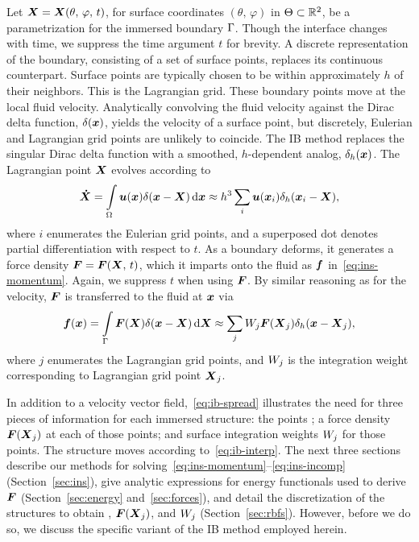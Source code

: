 Let $\boldsymbol{X} = \boldsymbol{X}(\theta,\,\varphi,\,t)$, for surface coordinates $(\theta,\,\varphi)$ in
$\Theta\subset\mathbb{R}^2$, be a parametrization for the immersed boundary $\Gamma$.
Though the interface changes with time, we suppress the time argument $t$ for brevity. A
discrete representation of the boundary, consisting of a set of surface points, replaces
its continuous counterpart.  Surface points are typically chosen to be within
approximately $h$ of their neighbors.  This is the Lagrangian grid. These boundary points
move at the local fluid velocity.  Analytically convolving the fluid velocity against the
Dirac delta function, $\delta(\boldsymbol{x})$, yields the velocity of a surface point, but
discretely, Eulerian and Lagrangian grid points are unlikely to coincide. The IB method
replaces the singular Dirac delta function with a smoothed, $h$-dependent analog,
$\delta_h(\boldsymbol{x})$. The Lagrangian point $\boldsymbol{X}$ evolves according to
\begin{equation}\label{eq:ib-interp}
    \vec{\dot{X}}
        = \int\limits_{\domain} \u(\x) \Dirac(\x-\X) \d\x
        \approx h^3 \sum_{i} \u(\x_i) \Dirac_h(\x_i-\X),
\end{equation}
where $i$ enumerates the Eulerian grid points, and a superposed dot denotes partial
differentiation with respect to $t$. As a boundary deforms, it generates a force density
$\boldsymbol{F} = \boldsymbol{F}(\boldsymbol{X},\,t)$, which it imparts onto the fluid as $\boldsymbol{f}$ in~\eqref{eq:ins-momentum}.
Again, we suppress $t$ when using $\boldsymbol{F}$. By similar reasoning as for the velocity, $\boldsymbol{F}$ is
transferred to the fluid at $\boldsymbol{x}$ via
\begin{equation}\label{eq:ib-spread}
        \f(\x)
        = \int\limits_{\interface} \F(\X)\Dirac(\x-\X) \d\X
        \approx \sum_{j} \weight[j]\F(\X_j) \Dirac_h(\x-\X_j),
\end{equation}
where $j$ enumerates the Lagrangian grid points, and $\weight[j]$ is the integration
weight corresponding to Lagrangian grid point $\boldsymbol{X}_j$. 

In addition to a velocity vector field,~\eqref{eq:ib-spread} illustrates the need for
three pieces of information for each immersed structure: the points ; a force density $\boldsymbol{F}(\boldsymbol{X}_j)$ at each of those points;
and surface integration weights $\weight[j]$ for those points. The structure moves
according to~\eqref{eq:ib-interp}. The next three sections describe our methods for
solving~\eqref{eq:ins-momentum}--\eqref{eq:ins-incomp} (Section~\ref{sec:ins}), give
analytic expressions for energy functionals used to derive $\boldsymbol{F}$ (Section~\ref{sec:energy}
and~\ref{sec:forces}), and detail the discretization of the structures to obtain
, $\boldsymbol{F}(\boldsymbol{X}_j)$, and $\weight[j]$ (Section~\ref{sec:rbfs}). However, before we
do so, we discuss the specific variant of the IB method employed herein.

